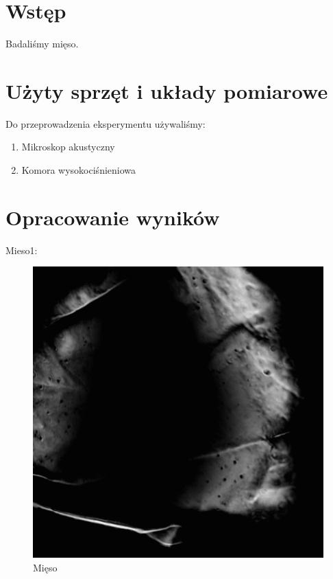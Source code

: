 \documentclass[a4paper,12pt]{article}
\begin{document}
\section{Wstęp}

Badaliśmy mięso.


\section{Użyty sprzęt i układy pomiarowe}

Do przeprowadzenia eksperymentu używaliśmy: 

\begin{enumerate}
  \item Mikroskop akustyczny
  \item Komora wysokociśnieniowa
  
\end{enumerate}


\section{Opracowanie wyników}

Mieso1:


\begin{figure} [H]
  \begin{center}
    \includegraphics[width = 15cm]{data/MIESO1.png}
    \caption{Mięso}
  \end{center}
\end{figure}
\end{document}
